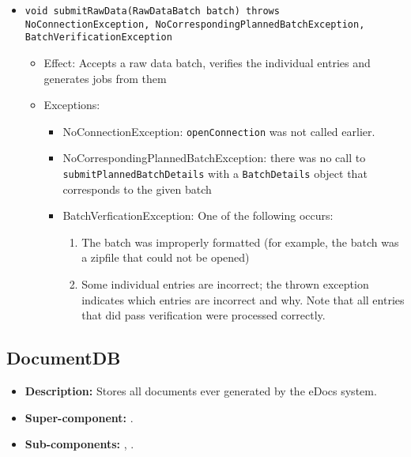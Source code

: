 \begin{itemize}
\begin{itemize}
		\item \texttt{void submitRawData(RawDataBatch batch) throws NoConnectionException, NoCorrespondingPlannedBatchException, BatchVerificationException}
		\begin{itemize}
			\item Effect: Accepts a raw data batch, verifies the individual entries and generates jobs from them
			\item Exceptions:
			\begin{itemize}
				\item NoConnectionException: \texttt{openConnection} was not called earlier.
				\item NoCorrespondingPlannedBatchException: there was no call to \texttt{submitPlannedBatchDetails} with a \texttt{BatchDetails} object that corresponds to the given batch
				\item BatchVerficationException: One of the following occurs:
				\begin{enumerate}
					\item The batch was improperly formatted (for example, the batch was a zipfile that could not be opened)
					\item Some individual entries are incorrect; the thrown exception indicates which entries are incorrect and why. Note that all entries that did pass verification were processed correctly.
				\end{enumerate} 
			\end{itemize}
		\end{itemize}
	\end{itemize}
\end{itemize}

\subsection{DocumentDB}
\begin{itemize}
    \item \textbf{Description:} Stores all documents ever generated by the eDocs system.
    \item \textbf{Super-component:} .
    \item \textbf{Sub-components:} , .
\end{itemize}

